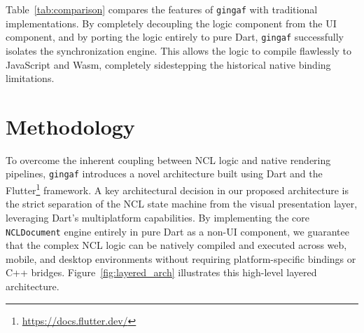\documentclass[sigconf,authorversion,review,authordraft]{webmedia}
\newcommand{\projectname}{\texttt{gingaf}}
\begin{document}
Table~\ref{tab:comparison} compares the features of \projectname{} with traditional implementations. By completely decoupling the logic component from the UI component, and by porting the logic entirely to pure Dart, \projectname{} successfully isolates the synchronization engine. This allows the logic to compile flawlessly to JavaScript and Wasm, completely sidestepping the historical native binding limitations.

\section{Methodology}
\label{sec:methodology}

To overcome the inherent coupling between NCL logic and native rendering pipelines, \projectname{} introduces a novel architecture built using Dart and the Flutter\footnote{\url{https://docs.flutter.dev/}} framework. A key architectural decision in our proposed architecture is the strict separation of the NCL state machine from the visual presentation layer, leveraging Dart's multiplatform capabilities. By implementing the core \texttt{NCLDocument} engine entirely in pure Dart as a non-UI component, we guarantee that the complex NCL logic can be natively compiled and executed across web, mobile, and desktop environments without requiring platform-specific bindings or C++ bridges. Figure~\ref{fig:layered_arch} illustrates this high-level layered architecture.
\end{document}

